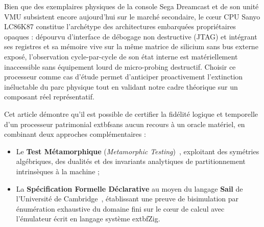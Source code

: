 \documentclass[10pt,journal,compsoc]{IEEEtran}
\begin{document}
Bien que des exemplaires physiques de la console Sega Dreamcast et de son unité VMU subsistent encore aujourd'hui sur le marché secondaire, le cœur CPU Sanyo LC86K87 constitue l'archétype des architectures embarquées propriétaires opaques : dépourvu d'interface de débogage non destructive (JTAG) et intégrant ses registres et sa mémoire vive sur la même matrice de silicium sans bus externe exposé, l'observation cycle-par-cycle de son état interne est matériellement inaccessible sans équipement lourd de micro-probing destructif. Choisir ce processeur comme cas d'étude permet d'anticiper proactivement l'extinction inéluctable du parc physique tout en validant notre cadre théorique sur un composant réel représentatif.

Cet article démontre qu'il est possible de certifier la fidélité logique et temporelle d'un processeur patrimonial 	extbf{sans aucun recours à un oracle matériel}, en combinant deux approches complémentaires :
\begin{itemize}
    \item Le \textbf{Test Métamorphique} (\textit{Metamorphic Testing})~\cite{chen1998, chen2018review}, exploitant des symétries algébriques, des dualités et des invariants analytiques de partitionnement intrinsèques à la machine ;
    \item La \textbf{Spécification Formelle Déclarative} au moyen du langage \textbf{Sail} de l'Université de Cambridge~\cite{armstrong2019}, établissant une preuve de bisimulation par énumération exhaustive du domaine fini sur le cœur de calcul avec l'émulateur écrit en langage système 	extbf{Zig}.
\end{itemize}
\end{document}
